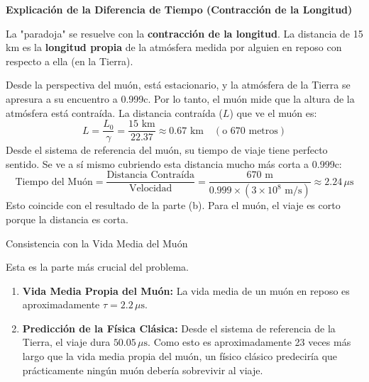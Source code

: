 \documentclass[11pt,a4paper]{article}
\begin{document}
\begin{enumerate}
\begin{itemize}
\textbf{Explicación de la Diferencia de Tiempo (Contracción de la Longitud)}

La "paradoja" se resuelve con la \textbf{contracción de la longitud}. La distancia de 15 km es la \textbf{longitud propia} de la atmósfera medida por alguien en reposo con respecto a ella (en la Tierra).

Desde la perspectiva del muón, está estacionario, y la atmósfera de la Tierra se apresura a su encuentro a 0.999c. Por lo tanto, el muón mide que la altura de la atmósfera está contraída. La distancia contraída ($L$) que ve el muón es:
\[ L = \frac{L_0}{\gamma} = \frac{15 \text{ km}}{22.37} \approx 0.67 \text{ km} \quad (\text{o 670 metros}) \]
Desde el sistema de referencia del muón, su tiempo de viaje tiene perfecto sentido. Se ve a sí mismo cubriendo esta distancia mucho más corta a 0.999c:
\[ \text{Tiempo del Muón} = \frac{\text{Distancia Contraída}}{\text{Velocidad}} = \frac{670 \text{ m}}{0.999 \times (3 \times 10^8 \text{ m/s})} \approx 2.24 \, \mu\text{s} \]
Esto coincide con el resultado de la parte (b). Para el muón, el viaje es corto porque la distancia es corta.

\textbf{}{Consistencia con la Vida Media del Muón}

Esta es la parte más crucial del problema.
\begin{enumerate}
    \item \textbf{Vida Media Propia del Muón:} La vida media de un muón en reposo es aproximadamente $\tau = 2.2 \, \mu\text{s}$.

    \item \textbf{Predicción de la Física Clásica:} Desde el sistema de referencia de la Tierra, el viaje dura $50.05 \, \mu\text{s}$. Como esto es aproximadamente 23 veces más largo que la vida media propia del muón, un físico clásico predeciría que prácticamente ningún muón debería sobrevivir al viaje.


\end{enumerate}
\end{itemize}
\end{enumerate}
\end{document}
